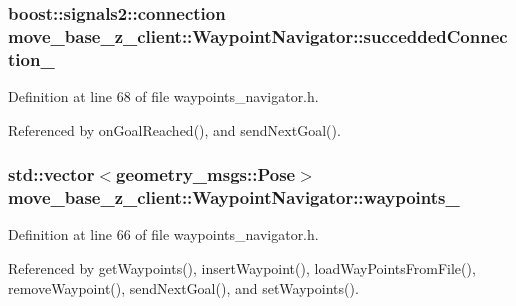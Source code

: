 \subsubsection[{\texorpdfstring{succedded\+Connection\+\_\+}{succeddedConnection_}}]{\setlength{\rightskip}{0pt plus 5cm}boost\+::signals2\+::connection move\+\_\+base\+\_\+z\+\_\+client\+::\+Waypoint\+Navigator\+::succedded\+Connection\+\_\+\hspace{0.3cm}{\ttfamily [private]}}\hypertarget{classmove__base__z__client_1_1WaypointNavigator_a139d492345875777d9c9a79f9b2d494b}{}\label{classmove__base__z__client_1_1WaypointNavigator_a139d492345875777d9c9a79f9b2d494b}


Definition at line 68 of file waypoints\+\_\+navigator.\+h.



Referenced by on\+Goal\+Reached(), and send\+Next\+Goal().

\subsubsection[{\texorpdfstring{waypoints\+\_\+}{waypoints_}}]{\setlength{\rightskip}{0pt plus 5cm}std\+::vector$<$geometry\+\_\+msgs\+::\+Pose$>$ move\+\_\+base\+\_\+z\+\_\+client\+::\+Waypoint\+Navigator\+::waypoints\+\_\+\hspace{0.3cm}{\ttfamily [private]}}\hypertarget{classmove__base__z__client_1_1WaypointNavigator_a83e4e39987eaf1c8856d32d581eb4cd0}{}\label{classmove__base__z__client_1_1WaypointNavigator_a83e4e39987eaf1c8856d32d581eb4cd0}


Definition at line 66 of file waypoints\+\_\+navigator.\+h.



Referenced by get\+Waypoints(), insert\+Waypoint(), load\+Way\+Points\+From\+File(), remove\+Waypoint(), send\+Next\+Goal(), and set\+Waypoints().

